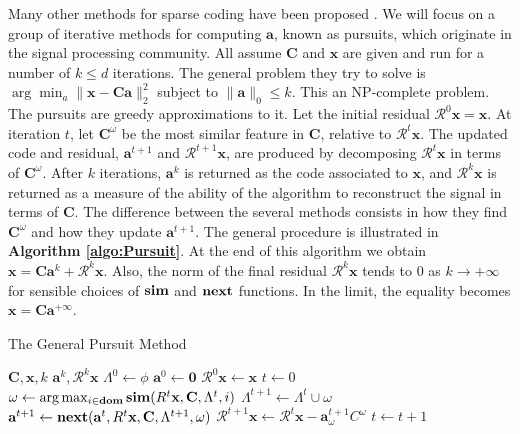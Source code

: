 \documentclass[12pt,a4paper,oneside,english]{UPBThesis}
\begin{document}
Many other methods for sparse coding have been proposed \cite{undetermined-minimal-L1,sparse-coding-strategy-V1}. We will focus on a group of iterative methods for computing $\textbf{a}$, known as pursuits, which originate in the signal processing community. All assume $\textbf{C}$ and $\textbf{x}$ are given and run for a number of $k \leq d$ iterations. The general problem they try to solve is $\arg\min_a \|\textbf{x} - \textbf{C}\textbf{a}\|_2^2$ subject to $\|\textbf{a}\|_0 \leq k$. This an NP-complete problem. The pursuits are greedy approximations to it. Let the initial residual $\mathcal{R}^0\textbf{x} = \textbf{x}$. At iteration $t$, let $\textbf{C}^\omega$ be the most similar feature in $\textbf{C}$, relative to $\mathcal{R}^t\textbf{x}$. The updated code and residual, $\textbf{a}^{t+1}$ and $\mathcal{R}^{t+1}\textbf{x}$, are produced by decomposing $\mathcal{R}^t\textbf{x}$ in terms of $\textbf{C}^\omega$. After $k$ iterations, $\textbf{a}^k$ is returned as the code associated to $\textbf{x}$, and $\mathcal{R}^k\textbf{x}$ is returned as a measure of the ability of the algorithm to reconstruct the signal in terms of $\textbf{C}$. The difference between the several methods consists in how they find $\textbf{C}^\omega$ and how they update $\textbf{a}^{t+1}$. The general procedure is illustrated in \textbf{Algorithm \ref{algo:Pursuit}}. At the end of this algorithm we obtain $\textbf{x} = \textbf{C}\textbf{a}^k + \mathcal{R}^k\textbf{x}$. Also, the norm of the final residual $\mathcal{R}^k\textbf{x}$ tends to $0$ as $k \rightarrow +\infty$ for sensible choices of $\text{\textbf{sim}}$ and $\text{\textbf{next}}$ functions. In the limit, the equality becomes $\textbf{x} = \textbf{C}\textbf{a}^{+\infty}$. 

\begin{algorithm}
\caption{The General Pursuit Method}
\label{algo:Pursuit}
\begin{algorithmic}
\Require $\textbf{C},\textbf{x},k$
\Ensure $\textbf{a}^k,\mathcal{R}^k\textbf{x}$
\State $\Lambda^0 \gets \phi$
\State $\textbf{a}^0 \gets \textbf{0}$
\State $\mathcal{R}^0\textbf{x} \gets \textbf{x}$
\State $t \gets 0$
\State $\omega \gets \arg \max_{i \in \textbf{dom}} \text{\textbf{sim}}(R^t\textbf{x},\textbf{C},\Lambda^t,i)$
\State $\Lambda^{t+1} \gets \Lambda^t \cup \omega$
\State $\textbf{a}^{t+1} \gets \text{\textbf{next}}(\textbf{a}^t,R^t\textbf{x},\textbf{C},\Lambda^{t+1},\omega)$
\State $\mathcal{R}^{t+1}\textbf{x} \gets \mathcal{R}^t\textbf{x} - \textbf{a}^{t+1}_\omega C^\omega$
\State $t \gets t + 1$
\EndWhile
\end{algorithmic}
\end{algorithm}
\end{document}
